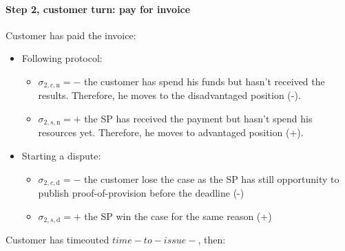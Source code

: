 \documentclass{ieeeaccess}
\begin{document}
\paragraph{Step 2, customer turn: pay for invoice}\label{step-2-pay-for-invoice}

Customer has paid the invoice:

\begin{itemize}
\item
  Following protocol:

  \begin{itemize}
  
  \item
    \(\sigma_{2, c, \mathrm{n}} = -\) the customer has spend his funds
    but hasn't received the results. Therefore, he moves to the
    disadvantaged position (-).
  \item
    \(\sigma_{2, s, \mathrm{n}} = +\) the SP has received the payment
    but hasn't spend his resources yet. Therefore, he moves to advantaged
    position (+).
  \end{itemize}
\item
  Starting a dispute:

  \begin{itemize}
  
  \item
    \(\sigma_{2, c, \mathrm{d}} = -\) the customer lose the case as the
    SP has still opportunity to publish proof-of-provision before the
    deadline (-)
  \item
    \(\sigma_{2, s, \mathrm{d}} = +\) the SP win the case for the same
    reason (+)
  \end{itemize}
\end{itemize}

Customer has timeouted \(time-to-issue-\), then:
\end{document}
